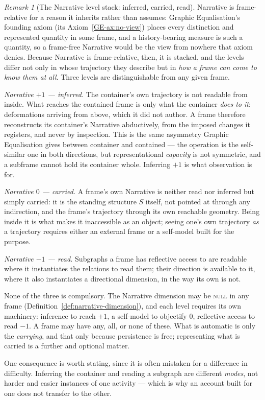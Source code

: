 \documentclass[11pt,a4paper]{article}
\theoremstyle{remark}
\newtheorem{remark}[definition]{Remark}
\begin{document}
\begin{remark}[The Narrative level stack: inferred, carried, read]\label{rem:level-stack}
Narrative is frame-relative for a reason it inherits rather than assumes: Graphic Equalisation's
founding axiom (its Axiom~\ref{GE-ax:no-view}) places every distinction and represented quantity in some frame, and a
history-bearing measure is such a quantity, so a frame-free Narrative would be the view from nowhere
that axiom denies. Because Narrative is frame-relative, then, it is stacked, and the levels differ not only in whose trajectory they describe but in \emph{how a frame can come to know them at all}. Three levels are distinguishable from any given frame.

\emph{Narrative $+1$ --- inferred.} The container's own trajectory is not readable from inside. What reaches the contained frame is only what the container \emph{does to it}: deformations arriving from above, which it did not author. A frame therefore reconstructs its container's Narrative abductively, from the imposed changes it registers, and never by inspection. This is the same asymmetry Graphic Equalisation gives between container and contained --- the operation is the self-similar one in both directions, but representational \emph{capacity} is not symmetric, and a subframe cannot hold its container whole. Inferring $+1$ is what observation is for.

\emph{Narrative $0$ --- carried.} A frame's own Narrative is neither read nor inferred but simply carried: it is the standing structure $S$ itself, not pointed at through any indirection, and the frame's trajectory through its own reachable geometry. Being inside it is what makes it inaccessible as an object; seeing one's own trajectory \emph{as} a trajectory requires either an external frame or a self-model built for the purpose.

\emph{Narrative $-1$ --- read.} Subgraphs a frame has reflective access to are readable where it instantiates the relations to read them; their direction is available to it, where it also instantiates a directional dimension, in the way its own is not.

None of the three is compulsory. The Narrative dimension may be \textsc{null} in any frame (Definition~\ref{def:narrative-dimension}), and each level requires its own machinery: inference to reach $+1$, a self-model to objectify $0$, reflective access to read $-1$. A frame may have any, all, or none of these. What is automatic is only the \emph{carrying}, and that only because persistence is free; representing what is carried is a further and optional matter.

One consequence is worth stating, since it is often mistaken for a difference in difficulty. Inferring the container and reading a subgraph are different \emph{modes}, not harder and easier instances of one activity --- which is why an account built for one does not transfer to the other.
\end{remark}
\end{document}
